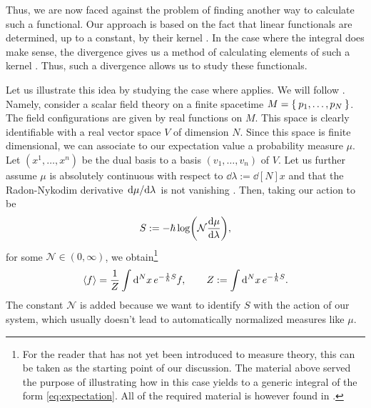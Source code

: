 Thus, we are now faced against the problem of finding another way to calculate such a functional. Our approach is based on the fact that linear functionals are determined, up to a constant, by their kernel \cite[see][Proposition 1.1.1]{Kadison1997}. In the case where the integral does make sense, the divergence gives us a method of calculating elements of such a kernel \cite[see][equation $(*)$]{Karp1981}. Thus, such a divergence allows us to study these functionals.

Let us illustrate this idea by studying the case where  applies. We will follow \cite{Costello2016, Gwilliam2018}. Namely, consider a scalar field theory on a finite spacetime $M=\Set{p_1,\dots,p_{N}}$. The field configurations are given by real functions on $M$. This space is clearly identifiable with a real vector space $V$ of dimension $N$. Since this space is finite dimensional, we can associate to our expectation value a probability measure $\mu$. Let $(x^1,\dots,x^n)$ be the dual basis to a basis $(v_1,\dots,v_n)$ of $V$. Let us further assume $\mu$ is absolutely continuous with respect to $\dd\lambda:=\dd[N]x$ and that the Radon-Nykodim derivative $\dv*{\mu}{\lambda}$ is not vanishing . Then, taking our action to be
\begin{equation}
S:=-\hbar\log(\mathcal{N}\dv{\mu}{\lambda}),
\end{equation}
for some $\mathcal{N}\in(0,\infty)$, we obtain\footnote{For the reader that has not yet been introduced to measure theory, this can be taken as the starting point of our discussion. The material above served the purpose of illustrating how in this case  yields to a generic integral of the form \eqref{eq:expectation}. All of the required material is however found in \cite{Hewitt1975}.}
\begin{equation}
\ev{f}=\frac{1}{Z}\int\dd[N]{x} e^{-\frac{1}{\hbar}S}f, \qquad Z:=\int\dd[N]{x} e^{-\frac{1}{\hbar}S}.
\end{equation}
The constant $\mathcal{N}$ is added because we want to identify $S$ with the action of our system, which usually doesn't lead to automatically normalized measures like $\mu$.

